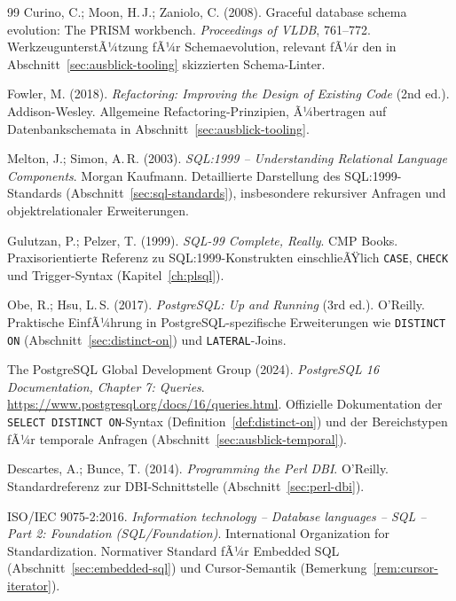﻿\documentclass[a4paper,12pt]{report}
\theoremstyle{definition}
\theoremstyle{remark}
\begin{document}
\begin{thebibliography}{99}
Curino, C.; Moon, H.\,J.; Zaniolo, C. (2008).
\newblock Graceful database schema evolution: The PRISM workbench.
\newblock \emph{Proceedings of VLDB}, 761--772.
\newblock WerkzeugunterstÃ¼tzung fÃ¼r Schemaevolution, relevant fÃ¼r den
in Abschnitt~\ref{sec:ausblick-tooling} skizzierten Schema-Linter.

Fowler, M. (2018).
\newblock \emph{Refactoring: Improving the Design of Existing Code}
(2nd ed.).
\newblock Addison-Wesley.
\newblock Allgemeine Refactoring-Prinzipien, Ã¼bertragen auf
Datenbankschemata in Abschnitt~\ref{sec:ausblick-tooling}.

Melton, J.; Simon, A.\,R. (2003).
\newblock \emph{SQL:1999 -- Understanding Relational Language Components}.
\newblock Morgan Kaufmann.
\newblock Detaillierte Darstellung des SQL:1999-Standards
(Abschnitt~\ref{sec:sql-standards}), insbesondere rekursiver Anfragen
und objektrelationaler Erweiterungen.

Gulutzan, P.; Pelzer, T. (1999).
\newblock \emph{SQL-99 Complete, Really}.
\newblock CMP Books.
\newblock Praxisorientierte Referenz zu SQL:1999-Konstrukten
einschlieÃŸlich \texttt{CASE}, \texttt{CHECK} und
Trigger-Syntax (Kapitel~\ref{ch:plsql}).

Obe, R.; Hsu, L.\,S. (2017).
\newblock \emph{PostgreSQL: Up and Running} (3rd ed.).
\newblock O'Reilly.
\newblock Praktische EinfÃ¼hrung in PostgreSQL-spezifische
Erweiterungen wie \texttt{DISTINCT ON}
(Abschnitt~\ref{sec:distinct-on}) und \texttt{LATERAL}-Joins.

The PostgreSQL Global Development Group (2024).
\newblock \emph{PostgreSQL 16 Documentation, Chapter 7: Queries}.
\newblock \url{https://www.postgresql.org/docs/16/queries.html}.
\newblock Offizielle Dokumentation der \texttt{SELECT
DISTINCT ON}-Syntax (Definition~\ref{def:distinct-on}) und der
Bereichstypen fÃ¼r temporale Anfragen
(Abschnitt~\ref{sec:ausblick-temporal}).


Descartes, A.; Bunce, T. (2014).
\newblock \emph{Programming the Perl DBI}.
\newblock O'Reilly.
\newblock Standardreferenz zur DBI-Schnittstelle
(Abschnitt~\ref{sec:perl-dbi}).

ISO/IEC 9075-2:2016.
\newblock \emph{Information technology -- Database languages -- SQL --
Part 2: Foundation (SQL/Foundation)}.
\newblock International Organization for Standardization.
\newblock Normativer Standard fÃ¼r Embedded SQL
(Abschnitt~\ref{sec:embedded-sql}) und Cursor-Semantik
(Bemerkung~\ref{rem:cursor-iterator}).


\end{thebibliography}
\end{document}
